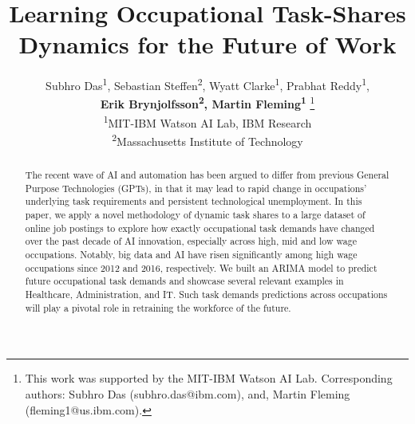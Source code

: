 \documentclass[letterpaper]{article} %
\title{Learning Occupational Task-Shares Dynamics for the Future of Work}
\author{Subhro Das\textsuperscript{\rm 1}, Sebastian Steffen\textsuperscript{\rm 2}, Wyatt Clarke\textsuperscript{\rm 1}, Prabhat Reddy\textsuperscript{\rm 1}, \\ 
{ \Large \bf Erik Brynjolfsson\textsuperscript{\rm 2}, Martin Fleming\textsuperscript{\rm 1} } \thanks{This work was supported by the MIT-IBM Watson AI Lab. Corresponding authors: Subhro Das (subhro.das@ibm.com), and, Martin Fleming (fleming1@us.ibm.com).}\\ 
\textsuperscript{\rm 1}MIT-IBM Watson AI Lab, IBM Research \\ 
\textsuperscript{\rm 2}Massachusetts Institute of Technology \\
}
\begin{document}
\maketitle

\begin{abstract}
The recent wave of AI and automation has been argued to differ from previous General Purpose Technologies (GPTs), in that it may lead to rapid change in occupations' underlying task requirements and persistent technological unemployment. In this paper, we apply a novel methodology of dynamic task shares to a large dataset of online job postings to explore how exactly occupational task demands have changed over the past decade of AI innovation, especially across high, mid and low wage occupations. Notably, big data and AI have risen significantly among high wage occupations since 2012 and 2016, respectively. We built an ARIMA model to predict future occupational task demands and showcase several relevant examples in Healthcare, Administration, and IT. Such task demands predictions across occupations will play a pivotal role in retraining the workforce of the future.
\end{abstract}


\end{document}
